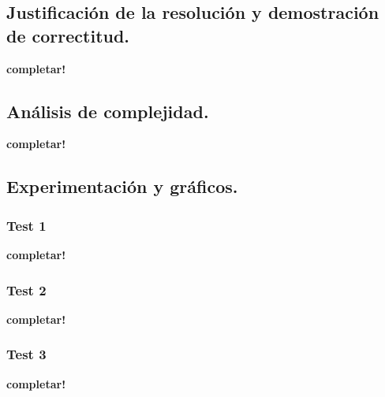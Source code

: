 \newpage
\subsection{Justificación de la resolución y demostración de correctitud.}

\vspace*{0.3cm}

\textbf{completar!}



\newpage
\subsection{Análisis de complejidad.}

\vspace*{0.3cm}

\textbf{completar!}



\newpage
\subsection{Experimentación y gráficos.}

\vspace*{0.3cm}

\subsubsection{Test 1}

\vspace*{0.3cm}

\textbf{completar!}


\newpage
\subsubsection{Test 2}

\vspace*{0.3cm}

\textbf{completar!}


\newpage
\subsubsection{Test 3}

\vspace*{0.3cm}

\textbf{completar!}
